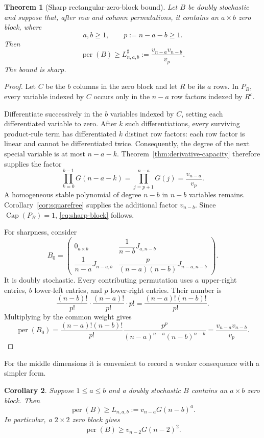 \documentclass[11pt]{article}
\newtheorem{theorem}{Theorem}[section]
\newtheorem{corollary}[theorem]{Corollary}
\theoremstyle{definition}
\newcommand{\per}{\operatorname{per}}
\newcommand{\pcap}{\operatorname{Cap}}
\newcommand{\1}{\mathbf{1}}
\begin{document}
\begin{theorem}[Sharp rectangular-zero-block bound]\label{thm:rectangular}
Let $B$ be doubly stochastic and suppose that, after row and column permutations, it contains an $a\times b$ zero block, where
\[
 a,b\ge1,
 \qquad
 p:=n-a-b\ge1.
\]
Then
\[
 \per(B)\ge
 L^{\sharp}_{n,a,b}:=
 \frac{v_{n-a}v_{n-b}}{v_p}.
 \tag{3.7}\label{eq:sharp-block}
\]
The bound is sharp.
\end{theorem}

\begin{proof}
Let $C$ be the $b$ columns in the zero block and let $R$ be its $a$ rows.  In $P_B$, every variable indexed by $C$ occurs only in the $n-a$ row factors indexed by $R^c$.

Differentiate successively in the $b$ variables indexed by $C$, setting each differentiated variable to zero.  After $k$ such differentiations, every surviving product-rule term has differentiated $k$ distinct row factors: each row factor is linear and cannot be differentiated twice.  Consequently, the degree of the next special variable is at most $n-a-k$.  Theorem~\ref{thm:derivative-capacity} therefore supplies the factor
\[
 \prod_{k=0}^{b-1}G(n-a-k)
 =\prod_{j=p+1}^{n-a}G(j)
 =\frac{v_{n-a}}{v_p}.
\]
A homogeneous stable polynomial of degree $n-b$ in $n-b$ variables remains.  Corollary~\ref{cor:squarefree} supplies the additional factor $v_{n-b}$.  Since $\pcap(P_B)=1$, \eqref{eq:sharp-block} follows.

For sharpness, consider
\[
 B_0=
 \begin{pmatrix}
  0_{a\times b} & \dfrac1{n-b}J_{a,n-b}\\[2mm]
  \dfrac1{n-a}J_{n-a,b} &
  \dfrac{p}{(n-a)(n-b)}J_{n-a,n-b}
 \end{pmatrix}.
\]
It is doubly stochastic.  Every contributing permutation uses $a$ upper-right entries, $b$ lower-left entries, and $p$ lower-right entries.  Their number is
\[
 \frac{(n-b)!}{p!}\cdot\frac{(n-a)!}{p!}\cdot p!
 =\frac{(n-a)!(n-b)!}{p!}.
\]
Multiplying by the common weight gives
\[
 \per(B_0)
 =\frac{(n-a)!(n-b)!}{p!}
  \frac{p^p}{(n-a)^{n-a}(n-b)^{n-b}}
 =\frac{v_{n-a}v_{n-b}}{v_p}.
\]
\end{proof}

For the middle dimensions it is convenient to record a weaker consequence with a simpler form.

\begin{corollary}\label{cor:weak-block}
Suppose $1\le a\le b$ and a doubly stochastic $B$ contains an $a\times b$ zero block.  Then
\[
 \per(B)\ge L_{n,a,b}:=v_{n-a}G(n-b)^a.
 \tag{3.8}\label{eq:weak-block}
\]
In particular, a $2\times2$ zero block gives
\[
 \per(B)\ge v_{n-2}G(n-2)^2.
 \tag{3.9}\label{eq:two-by-two}
\]
\end{corollary}
\end{document}
